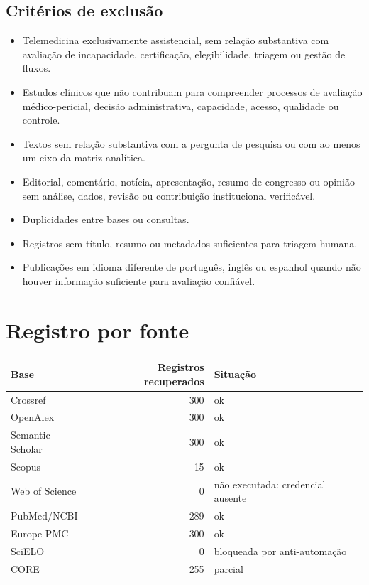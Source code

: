 \documentclass[12pt,a4paper]{article}
\begin{document}
\subsection{Critérios de exclusão}
\label{sec:org6746081}
\begin{itemize}
\item Telemedicina exclusivamente assistencial, sem relação substantiva com avaliação de incapacidade, certificação, elegibilidade, triagem ou gestão de fluxos.
\item Estudos clínicos que não contribuam para compreender processos de avaliação médico-pericial, decisão administrativa, capacidade, acesso, qualidade ou controle.
\item Textos sem relação substantiva com a pergunta de pesquisa ou com ao menos um eixo da matriz analítica.
\item Editorial, comentário, notícia, apresentação, resumo de congresso ou opinião sem análise, dados, revisão ou contribuição institucional verificável.
\item Duplicidades entre bases ou consultas.
\item Registros sem título, resumo ou metadados suficientes para triagem humana.
\item Publicações em idioma diferente de português, inglês ou espanhol quando não houver informação suficiente para avaliação confiável.
\end{itemize}

\section{Registro por fonte}
\label{sec:org1a68b81}
\begin{center}
\begin{tabular}{lrl}
Base & Registros recuperados & Situação\\
\hline
Crossref & 300 & ok\\
OpenAlex & 300 & ok\\
Semantic Scholar & 300 & ok\\
Scopus & 15 & ok\\
Web of Science & 0 & não executada: credencial ausente\\
PubMed/NCBI & 289 & ok\\
Europe PMC & 300 & ok\\
SciELO & 0 & bloqueada por anti-automação\\
CORE & 255 & parcial\\
\end{tabular}
\end{center}
\end{document}
